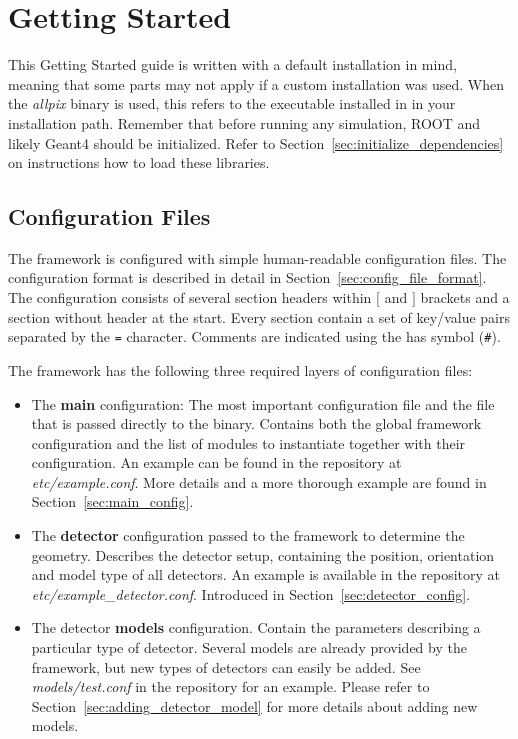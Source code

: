 \section{Getting Started}

This Getting Started guide is written with a default installation in mind, meaning that some parts may not apply if a custom installation was used.
When the \textit{allpix} binary is used, this refers to the executable installed in  in your installation path.
Remember that before running any \apsq simulation, ROOT and likely Geant4 should be initialized.
Refer to Section~\ref{sec:initialize_dependencies} on instructions how to load these libraries.

\subsection{Configuration Files}
\label{sec:configuration_files}
The framework is configured with simple human-readable configuration files.
The configuration format is described in detail in Section~\ref{sec:config_file_format}.
The configuration consists of several section headers within $[$ and $]$ brackets and a section without header at the start.
Every section contain a set of key/value pairs separated by the \texttt{=} character.
Comments are indicated using the has symbol (\texttt{\#}).

The framework has the following three required layers of configuration files:
\begin{itemize}
\item The \textbf{main} configuration: The most important configuration file and the file that is passed directly to the binary.
Contains both the global framework configuration and the list of modules to instantiate together with their configuration.
An example can be found in the repository at \textit{etc/example.conf}.
More details and a more thorough example are found in Section~\ref{sec:main_config}.
\item The \textbf{detector} configuration passed to the framework to determine the geometry.
Describes the detector setup, containing the position, orientation and model type of all detectors.
An example is available in the repository at \textit{etc/example\_detector.conf}.
Introduced in Section~\ref{sec:detector_config}.
\item The detector \textbf{models} configuration.
Contain the parameters describing a particular type of detector.
Several models are already provided by the framework, but new types of detectors can easily be added.
See \textit{models/test.conf} in the repository for an example.
Please refer to Section~\ref{sec:adding_detector_model} for more details about adding new models.
\end{itemize}

